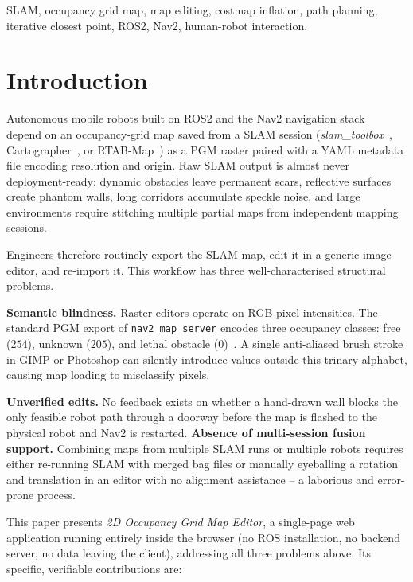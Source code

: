 \documentclass[journal]{IEEEtran}
\begin{document}
\begin{IEEEkeywords}
SLAM, occupancy grid map, map editing, costmap inflation, path planning, iterative closest point, ROS2, Nav2, human-robot interaction.
\end{IEEEkeywords}
\vspace{-2mm}
\section{Introduction}
\label{sec:intro}

Autonomous mobile robots built on ROS2 and the Nav2 navigation
stack~\cite{macenski2020marathon} depend on an occupancy-grid map saved from
a SLAM session (\emph{slam\_toolbox}~\cite{macenski2021slamtoolbox},
Cartographer~\cite{hess2016cartographer}, or
RTAB-Map~\cite{labbe2019rtabmap}) as a PGM raster paired with a YAML metadata
file encoding resolution and origin.  Raw SLAM output is almost never
deployment-ready: dynamic obstacles leave permanent scars, reflective surfaces
create phantom walls, long corridors accumulate speckle noise, and large
environments require stitching multiple partial maps from independent mapping
sessions.

Engineers therefore routinely export the SLAM map, edit it in a generic image
editor, and re-import it.  This workflow has three well-characterised
structural problems.

\textbf{Semantic blindness.}  Raster editors operate on RGB pixel intensities.
The standard PGM export of \texttt{nav2\_map\_server} encodes three
occupancy classes: free ($254$), unknown ($205$), and lethal obstacle
($0$)~\cite{nav2docs}.  A single anti-aliased brush stroke in GIMP or
Photoshop can silently introduce values outside this trinary alphabet, causing
map loading to misclassify pixels.

\textbf{Unverified edits.}  No feedback exists on whether a hand-drawn wall
blocks the only feasible robot path through a doorway before the map is
flashed to the physical robot and Nav2 is restarted. \textbf{Absence of multi-session fusion support.}  Combining maps from
multiple SLAM runs or multiple robots requires either re-running SLAM with
merged bag files or manually eyeballing a rotation and translation in an
editor with no alignment assistance -- a laborious and error-prone process.

This paper presents \emph{2D Occupancy Grid Map Editor}, a single-page web application
running entirely inside the browser (no ROS installation, no backend server,
no data leaving the client), addressing all three problems above.  Its
specific, verifiable contributions are:
\end{document}
